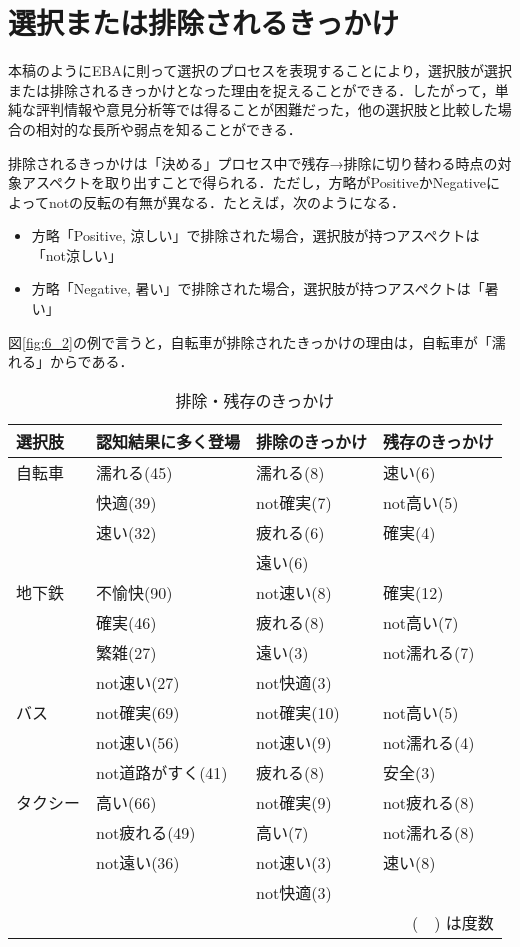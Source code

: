 \documentclass[japanese]{jnlp_1.3a}
\begin{document}
\section{選択または排除されるきっかけ}
\label{sec:kikkake}

本稿のようにEBAに則って選択のプロセスを表現することにより，選択肢が選択または排除されるきっかけとなった理由を捉えることができる．したがって，単純な評判情報や意見分析等では得ることが困難だった，他の選択肢と比較した場合の相対的な長所や弱点を知ることができる．

排除されるきっかけは「決める」プロセス中で残存→排除に切り替わる時点の対象アスペクトを取り出すことで得られる．ただし，方略がPositiveかNegativeによってnotの反転の有無が異なる．たとえば，次のようになる．
\begin{itemize}
\item 方略「Positive, 涼しい」で排除された場合，選択肢が持つアスペクトは「not涼しい」
\item 方略「Negative, 暑い」で排除された場合，選択肢が持つアスペクトは「暑い」
\end{itemize}
図\ref{fig:6_2}の例で言うと，自転車が排除されたきっかけの理由は，自転車が「濡れる」からである．

\begin{table}[bp]
  \caption{排除・残存のきっかけ}
  \begin{center}
    \begin{tabular}[t]{|l||l|l|l|} \hline
	選択肢 & 認知結果に多く登場 & 排除のきっかけ & 残存のきっかけ\\ \hline
	自転車   & 濡れる(45)        & 濡れる(8)   & 速い(6)      \\
		 & 快適(39)          & not確実(7)  & not高い(5)   \\
		 & 速い(32)          & 疲れる(6)   & 確実(4)      \\
		 &                   & 遠い(6)     &              \\ \hline
	地下鉄   & 不愉快(90)        & not速い(8)  & 確実(12)     \\
		 & 確実(46)          & 疲れる(8)   & not高い(7)   \\
		 & 繁雑(27)          & 遠い(3)     & not濡れる(7) \\
		 & not速い(27)       & not快適(3)  &              \\ \hline
	バス     & not確実(69)       & not確実(10) & not高い(5)   \\
		 & not速い(56)       & not速い(9)  & not濡れる(4) \\
		 & not道路がすく(41) & 疲れる(8)   & 安全(3)      \\ \hline
	タクシー & 高い(66)          & not確実(9)  & not疲れる(8) \\
		 & not疲れる(49)     & 高い(7)     & not濡れる(8) \\
		 & not遠い(36)       & not速い(3)  & 速い(8)      \\
		 &                   & not快適(3)  &              \\ \hline
      \multicolumn{4}{r}{(　) は度数}\\
    \end{tabular}
    \label{tab:kikkake}
  \end{center}
\end{table}
\end{document}
